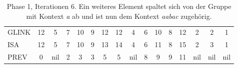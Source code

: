 \begin{table}[H]
\begin{adjustbox}{max width=\textwidth}
\begin{tabular}{lccccccccccccccc}
\multicolumn{1}{l|}{GLINK}   & 12                      & 5                         & 7                       & 10                                                 & 9                           & 12                        & 12                         & \cellcolor[HTML]{\red}4 & 6                         & 10 & 8                       & 12 & 2                         & 2                         & 1   \\
\multicolumn{1}{l|}{ISA}     & 12                      & 5                         & 7                       & 10                                                 & 9                           & 13                        & 14                         & \cellcolor[HTML]{\red}4 & 6                         & 11 & 8                       & 15 & \cellcolor[HTML]{\red}2 & \cellcolor[HTML]{\red}3 & 1   \\
\multicolumn{1}{l|}{PREV}    & 0                       & nil                       & 2                       & 3                                                  & 3                           & 5                         & 5                          & nil                       & \cellcolor[HTML]{\red}8 & 9  & 9                       & 11 & nil                       & nil                       & nil
\end{tabular}
\end{adjustbox}

\caption[Phase 1, Iterationen 6]{Phase 1, Iterationen 6. Ein weiteres Element spaltet sich von der Gruppe mit Kontext \textit{a} ab und ist nun dem Kontext \textit{aabac} zugehörig.}
\label{table_complex_example_1_6} 
\end{table}

